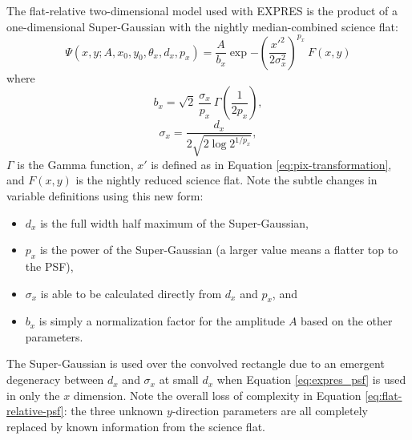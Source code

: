 The flat-relative two-dimensional model used with EXPRES is the product of a one-dimensional Super-Gaussian with the nightly median-combined science flat:
\begin{equation}
    \Psi(x, y; A, x_0, y_0, \theta_x, d_x, p_x) = \frac{A}{b_x} \exp{-\left(\frac{x'^2}{2\sigma_x^2}\right)^{p_x}}~F(x,y)
    \label{eq:flat-relative-psf}
\end{equation}
where
\begin{equation}
    b_x = \sqrt{2}~\frac{\sigma_x}{p_x}~\Gamma\left(\frac{1}{2 p_x}\right),
\end{equation}
\begin{equation}
    \sigma_x = \frac{d_x}{2\sqrt{2 \log{2}^{1/p_x}}},
\end{equation}
$\Gamma$ is the Gamma function, $x'$ is defined as in Equation \ref{eq:pix-transformation}, and $F(x,y)$ is the nightly reduced science flat. Note the subtle changes in variable definitions using this new form:
\begin{itemize}
    \item $d_x$ is the full width half maximum of the Super-Gaussian,
    \item $p_x$ is the power of the Super-Gaussian (a larger value means a flatter top to the PSF),
    \item $\sigma_x$ is able to be calculated directly from $d_x$ and $p_x$, and
    \item $b_x$ is simply a normalization factor for the amplitude $A$ based on the other parameters.
\end{itemize}
The Super-Gaussian is used over the convolved rectangle due to an emergent degeneracy between $d_x$ and $\sigma_x$ at small $d_x$ when Equation \ref{eq:expres_psf} is used in only the $x$ dimension. Note the overall loss of complexity in Equation \ref{eq:flat-relative-psf}: the three unknown $y$-direction parameters are all completely replaced by known information from the science flat.

